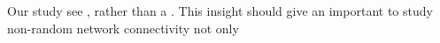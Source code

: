 Our study see  , rather than a . This insight should give an important to study non-random network connectivity not only 









